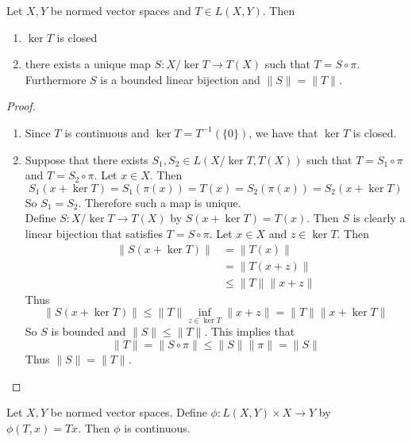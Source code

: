 \documentclass{book}
\begin{document}
	\begin{ex} \lex{}
		Let $X,Y$ be normed vector spaces and $T \in L(X,Y)$. Then
		\begin{enumerate}
			\item $\ker T$ is closed
			\item there exists a unique map $S :X/ \ker T \rightarrow T(X)$ such that $T = S \circ \pi$. Furthermore $S$ is a bounded linear bijection and $\|S \|= \|T \|$.
		\end{enumerate}
	\end{ex}
	
	\begin{proof}\
		\begin{enumerate}
			\item Since $T$ is continuous and $\ker T = T^{-1}(\{0\})$, we have that $\ker T$ is closed.
			\item Suppose that there exists $S_1,S_2 \in L(X/ \ker T, T(X)) $ such that $T = S_1 \circ \pi$ and  $T = S_2 \circ \pi $. Let $x \in X$. Then $$S_1(x + \ker T) = S_1(\pi(x)) = T(x) = S_2(\pi(x)) = S_2(x + \ker T)$$ So $S_1 = S_2$. Therefore such a map is unique.\\
			Define $S: X / \ker T \rightarrow T(X)$ by $S(x+ \ker T) = T(x)$. Then $S$ is clearly a linear bijection that satisfies $T = S \circ \pi$. Let $x \in X$ and $z \in \ker T$. Then 
			\begin{align*}
				\|S(x+ \ker T) \|
				& = \|T(x) \|\\
				& = \|T(x+z) \|\\
				& \leq \|T \|\|x+ z \|
			\end{align*} 
			Thus $$\|S(x+ \ker T) \|\leq \|T \|\inf_{z \in \ker T}  \|x + z \|= \|T \|\|x + \ker T \|$$
			So $S$ is bounded and $\|S \|\leq \|T \|$. This implies that $$\|T \|= \|S \circ \pi \|\leq \|S \|\|\pi \|= \|S \|$$
			Thus $\|S \|= \|T \|$.
		\end{enumerate}
	\end{proof}
	
	\begin{ex} \lex{}
		Let $X, Y$ be normed vector spaces. Define $\phi: L(X,Y) \times X \rightarrow Y$ by \\$\phi(T,x) = Tx$. Then $\phi$ is continuous.
	\end{ex}
	
\end{document}
